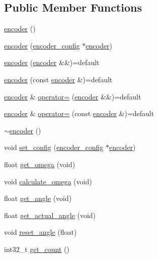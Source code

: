 \subsection*{Public Member Functions}
\begin{DoxyCompactItemize}
\item 
\mbox{\hyperlink{classencoder_af19dfa89c07692c0b1da8f24aec3d52d}{encoder}} ()
\item 
\mbox{\hyperlink{classencoder_a074f819c70398da9ce1af632dc391a19}{encoder}} (\mbox{\hyperlink{structencoder__config}{encoder\+\_\+config}} $\ast$\mbox{\hyperlink{classencoder}{encoder}})
\item 
\mbox{\hyperlink{classencoder_a612e51df8504a258ebab3f6cc296d0c4}{encoder}} (\mbox{\hyperlink{classencoder}{encoder}} \&\&)=default
\item 
\mbox{\hyperlink{classencoder_a6a9eb2f09a64535bc1105e415af90493}{encoder}} (const \mbox{\hyperlink{classencoder}{encoder}} \&)=default
\item 
\mbox{\hyperlink{classencoder}{encoder}} \& \mbox{\hyperlink{classencoder_a2e2784d15f3f7e13aecde2ead7a43a68}{operator=}} (\mbox{\hyperlink{classencoder}{encoder}} \&\&)=default
\item 
\mbox{\hyperlink{classencoder}{encoder}} \& \mbox{\hyperlink{classencoder_a9916948157fd30beeaf0fb141c356e2d}{operator=}} (const \mbox{\hyperlink{classencoder}{encoder}} \&)=default
\item 
\mbox{\hyperlink{classencoder_aa3b6033758cc93ea194c4b635c9547d6}{$\sim$encoder}} ()
\item 
void \mbox{\hyperlink{classencoder_afb36996f08db7f27e2df5334f90c8e53}{set\+\_\+config}} (\mbox{\hyperlink{structencoder__config}{encoder\+\_\+config}} $\ast$\mbox{\hyperlink{classencoder}{encoder}})
\item 
float \mbox{\hyperlink{classencoder_a9be6cc4f517fdc88970eb5d39e52f5c8}{get\+\_\+omega}} (void)
\item 
void \mbox{\hyperlink{classencoder_a8e8856a7fba7d2d7d11c1a1b2428b246}{calculate\+\_\+omega}} (void)
\item 
float \mbox{\hyperlink{classencoder_aba5b6ccdb374d7fcc5d9f2abab1a59da}{get\+\_\+angle}} (void)
\item 
float \mbox{\hyperlink{classencoder_a16dcda920abca2cbdb950a8124bce297}{get\+\_\+actual\+\_\+angle}} (void)
\item 
void \mbox{\hyperlink{classencoder_af37dc5bf8a2323a500dd55f5fef12afb}{reset\+\_\+angle}} (float)
\item 
int32\+\_\+t \mbox{\hyperlink{classencoder_a78c1ba3f2bd3abb6714a38b21a2f48e1}{get\+\_\+count}} ()
\end{DoxyCompactItemize}
